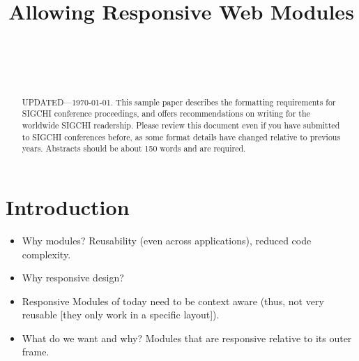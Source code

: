 \documentclass{sigchi}
\newcommand{\notetitle}{Allowing Responsive Web Modules}
\begin{document}
\title{\notetitle}

\author{%
  \\
  \\
  \\
}

\maketitle

\begin{abstract}
  UPDATED---\today. This sample paper describes the
  formatting requirements for SIGCHI conference proceedings, and
  offers recommendations on writing for the worldwide SIGCHI
  readership. Please review this document even if you have submitted
  to SIGCHI conferences before, as some format details have changed
  relative to previous years. Abstracts should be about 150 words and
  are required.
\end{abstract}


 

\section{Introduction}
  \begin{itemize}
    \item Why modules? Reusability (even across applications), reduced code complexity.
    \item Why responsive design?
    \item Responsive Modules of today need to be context aware (thus, not very reusable [they only work in a specific layout]).
    \item What do we want and why? Modules that are responsive relative to its outer frame.
  \end{itemize}
\end{document}

